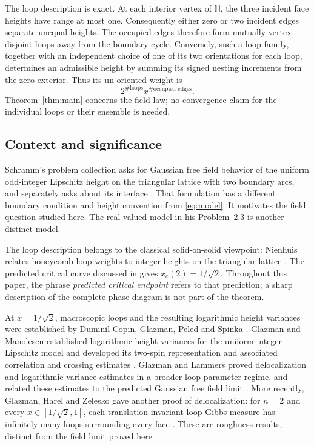 \documentclass[11pt]{article}
\newcommand{\hexlat}{\mathbb H}
\theoremstyle{definition}
\theoremstyle{remark}
\numberwithin{equation}{section}
\begin{document}
The loop description is exact.  At each interior vertex of $\hexlat$, the
three incident face heights have range at most one.  Consequently either
zero or two incident edges separate unequal heights.  The occupied edges
therefore form mutually vertex-disjoint loops away from the boundary
cycle.  Conversely, such a loop family, together with an independent
choice of one of its two orientations for each loop, determines an
admissible height by summing its signed nesting increments from the zero
exterior.  Thus its un-oriented weight is
\begin{equation}\label{eq:loop-weight}
 2^{\#\text{loops}}x^{\#\text{occupied edges}}.
\end{equation}
Theorem~\ref{thm:main} concerns the field law; no convergence claim for the
individual loops or their ensemble is needed.

\subsection{Context and significance}

Schramm's problem collection asks for Gaussian free field behavior of the
uniform odd-integer Lipschitz height on the triangular lattice with two
boundary arcs, and separately asks about its interface
\cite[Problem~2.2]{Schramm2007}.  That formulation has a different boundary
condition and height convention from \eqref{eq:model}.  It motivates the
field question studied here.  The real-valued model in his Problem~2.3 is
another distinct model.

The loop description belongs to the classical solid-on-solid viewpoint:
Nienhuis relates honeycomb loop weights to integer heights on the
triangular lattice \cite[p.~1062]{Nienhuis1982}.
The predicted critical curve discussed in
\cite[Section~1.4.1]{GL2025} gives $x_c(2)=1/\sqrt2$.
Throughout this paper, the phrase \emph{predicted critical endpoint}
refers to that prediction; a sharp description of the complete phase
diagram is not part of the theorem.

At $x=1/\sqrt2$, macroscopic loops and the resulting logarithmic height
variances were established by Duminil-Copin, Glazman, Peled and Spinka
\cite[Theorem~1 and Section~1.2]{DGPS2021}.
Glazman and Manolescu established logarithmic height variances for the uniform
integer Lipschitz model and developed its two-spin representation and
associated correlation and crossing estimates \cite{GM2021}.
Glazman and Lammers proved delocalization and logarithmic variance
estimates in a broader loop-parameter regime, and related these estimates
to the predicted Gaussian free field limit
\cite[Section~1.2.4]{GL2025}.  More recently, Glazman, Harel and Zelesko
gave another proof of delocalization: for $n=2$ and every
$x\in[1/\sqrt2,1]$, each translation-invariant loop Gibbs measure
has infinitely many loops surrounding every face
\cite[Theorem~2]{GHZ2025}.  These are roughness results, distinct from
the field limit proved here.
\end{document}

